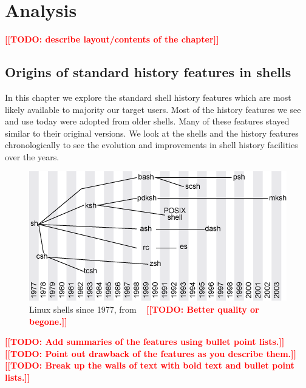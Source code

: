 \documentclass[thesis=M,english]{FITthesis}[2012/10/20]
\newcommand{\blind}[1][1]{}
\newcommand{\todotext}[1]{\textcolor{red}{\textbf{[[#1]]}}}
\newcommand{\tmpframe}[1]{\fbox{#1}}
\renewcommand{\tmpframe}[1]{#1}
\newcommand{\permanentframe}[1]{\fbox{#1}}
\let\myCite\cite
\renewcommand\cite{\unskip~\myCite}
\begin{document}



\chapter{Analysis}




\todotext{TODO: describe layout/contents of the chapter}

\blind

\section{Origins of standard history features in shells}

In this chapter we explore the standard shell history features which are most likely available to majority our target users.
Most of the history features we see and use today were adopted from older shells. Many of these features stayed similar to their original versions. We look at the shells and the history features chronologically to see the evolution and improvements in shell history facilities over the years.  


\begin{figure}
  \tmpframe{\includegraphics[width=\linewidth]{figures/misc/shells.png}}
  \caption{Linux shells since 1977, from \cite{jones2011shells} \todotext{TODO: Better quality or begone.}}
\end{figure}

\todotext{TODO: Add summaries of the features using bullet point lists.}
\todotext{TODO: Point out drawback of the features as you describe them.}
\todotext{TODO: Break up the walls of text with bold text and bullet point lists.}
\end{document}
